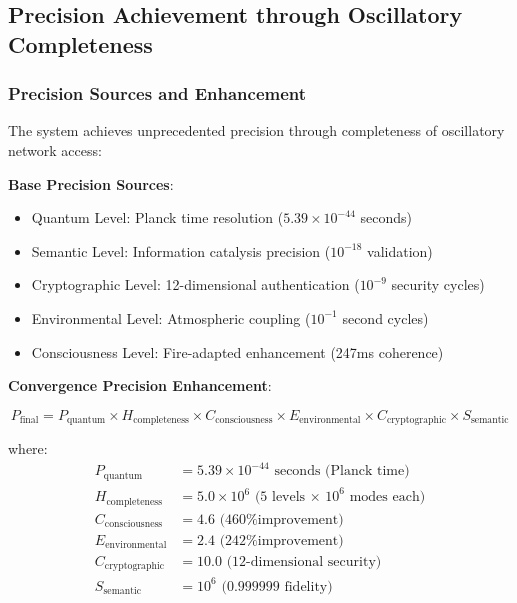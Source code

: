 \documentclass[12pt,a4paper]{article}
\begin{document}
{\subsection{Precision Achievement through Oscillatory Completeness}

\subsubsection{Precision Sources and Enhancement}

The system achieves unprecedented precision through completeness of oscillatory network access:

\textbf{Base Precision Sources}:
\begin{itemize}
\item Quantum Level: Planck time resolution ($5.39 \times 10^{-44}$ seconds)
\item Semantic Level: Information catalysis precision ($10^{-18}$ validation)
\item Cryptographic Level: 12-dimensional authentication ($10^{-9}$ security cycles)
\item Environmental Level: Atmospheric coupling ($10^{-1}$ second cycles)
\item Consciousness Level: Fire-adapted enhancement (247ms coherence)
\end{itemize}

\textbf{Convergence Precision Enhancement}:

\begin{equation}
P_{\text{final}} = P_{\text{quantum}} \times H_{\text{completeness}} \times C_{\text{consciousness}} \times E_{\text{environmental}} \times C_{\text{cryptographic}} \times S_{\text{semantic}}
\end{equation}

where:
\begin{align}
P_{\text{quantum}} &= 5.39 \times 10^{-44} \text{ seconds (Planck time)} \\
H_{\text{completeness}} &= 5.0 \times 10^6 \text{ (5 levels × 10}^6 \text{ modes each)} \\
C_{\text{consciousness}} &= 4.6 \text{ (460\% improvement)} \\
E_{\text{environmental}} &= 2.4 \text{ (242\% improvement)} \\
C_{\text{cryptographic}} &= 10.0 \text{ (12-dimensional security)} \\
S_{\text{semantic}} &= 10^6 \text{ (0.999999 fidelity)}
\end{align}

}
\end{document}
